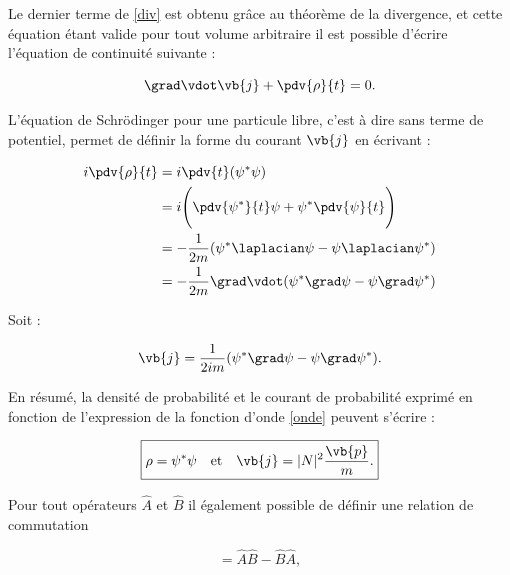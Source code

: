         Le dernier terme de \ref{div} est obtenu grâce au théorème de la divergence, et cette équation étant valide pour tout volume arbitraire il est possible d'écrire l'équation de continuité suivante :

        \begin{equation}
            \grad\vdot\vb{j}+\pdv{\rho}{t}=0.
        \end{equation}

        L'équation de Schrödinger pour une particule libre, c'est à dire sans terme de potentiel, permet de définir la forme du courant $\vb{j}$ en écrivant :

        \begin{equation*}
        \begin{split}
        i\pdv{\rho}{t} & =i\pdv{t}(\large\psi^*\psi) \\
         & = i\Biggl(\pdv{\psi^*}{t}\psi + \psi^*\pdv{\psi}{t}\Biggr) \\
         & = -\frac{1}{2m}(\psi^*\laplacian\psi-\psi\laplacian\psi^*) \\
         & = -\frac{1}{2m}\grad\vdot(\psi^*\grad\psi-\psi\grad\psi^*) \\
        \end{split}
        \end{equation*}

        Soit :

        \begin{equation*}
            \vb{j} = \frac{1}{2im}(\psi^*\grad\psi-\psi\grad\psi^*). \\
        \end{equation*}

        En résumé, la densité de probabilité et le courant de probabilité exprimé en fonction de l'expression de la fonction d'onde \ref{onde} peuvent s'écrire :

        \begin{equation}
            \boxed{
            \rho=\psi^*\psi \quad \mbox{et} \quad \vb{j}=|N|^2\frac{\vb{p}}{m}.
            }
        \end{equation}
        
        Pour tout opérateurs $\hat{A}$ et $\hat{B}$ il également possible de définir une relation de commutation 
        
        \begin{equation}
            [\hat{A},\hat{B}]=\hat{A}\hat{B}-\hat{B}\hat{A},
        \end{equation}
        
